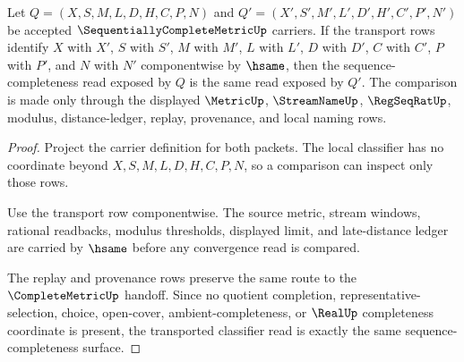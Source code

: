 \begin{theorem}
\label{thm:sequentially-complete-metric-classifier-transport}
Let $Q=(X,S,M,L,D,H,C,P,N)$ and $Q'=(X',S',M',L',D',H',C',P',N')$ be accepted $\SequentiallyCompleteMetricUp$ carriers. If the transport rows identify $X$ with $X'$, $S$ with $S'$, $M$ with $M'$, $L$ with $L'$, $D$ with $D'$, $C$ with $C'$, $P$ with $P'$, and $N$ with $N'$ componentwise by $\hsame$, then the sequence-completeness read exposed by $Q$ is the same read exposed by $Q'$. The comparison is made only through the displayed $\MetricUp$, $\StreamNameUp$, $\RegSeqRatUp$, modulus, distance-ledger, replay, provenance, and local naming rows.
\end{theorem}
\begin{proof}
Project the carrier definition for both packets. The local classifier has no coordinate beyond $X,S,M,L,D,H,C,P,N$, so a comparison can inspect only those rows.

Use the transport row componentwise. The source metric, stream windows, rational readbacks, modulus thresholds, displayed limit, and late-distance ledger are carried by $\hsame$ before any convergence read is compared.

The replay and provenance rows preserve the same route to the $\CompleteMetricUp$ handoff. Since no quotient completion, representative-selection, choice, open-cover, ambient-completeness, or $\RealUp$ completeness coordinate is present, the transported classifier read is exactly the same sequence-completeness surface.
\end{proof}

